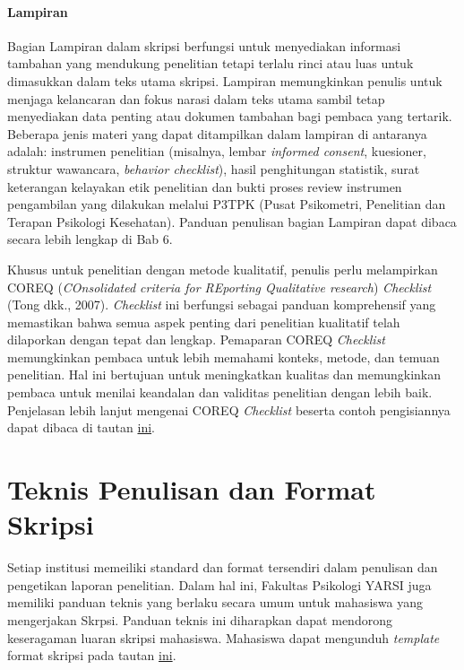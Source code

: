 \documentclass[
  indonesian,
  letterpaper,
]{scrbook}
\begin{document}
\subsubsection{Lampiran}\label{lampiran}

Bagian Lampiran dalam skripsi berfungsi untuk menyediakan informasi
tambahan yang mendukung penelitian tetapi terlalu rinci atau luas untuk
dimasukkan dalam teks utama skripsi. Lampiran memungkinkan penulis untuk
menjaga kelancaran dan fokus narasi dalam teks utama sambil tetap
menyediakan data penting atau dokumen tambahan bagi pembaca yang
tertarik. Beberapa jenis materi yang dapat ditampilkan dalam lampiran di
antaranya adalah: instrumen penelitian (misalnya, lembar \emph{informed
consent}, kuesioner, struktur wawancara, \emph{behavior checklist}),
hasil penghitungan statistik, surat keterangan kelayakan etik penelitian
dan bukti proses review instrumen pengambilan yang dilakukan melalui
P3TPK (Pusat Psikometri, Penelitian dan Terapan Psikologi Kesehatan).
Panduan penulisan bagian Lampiran dapat dibaca secara lebih lengkap di
Bab 6.

Khusus untuk penelitian dengan metode kualitatif, penulis perlu
melampirkan COREQ (\emph{COnsolidated criteria for REporting Qualitative
research}) \emph{Checklist} (Tong dkk., 2007). \emph{Checklist} ini
berfungsi sebagai panduan komprehensif yang memastikan bahwa semua aspek
penting dari penelitian kualitatif telah dilaporkan dengan tepat dan
lengkap. Pemaparan COREQ \emph{Checklist} memungkinkan pembaca untuk
lebih memahami konteks, metode, dan temuan penelitian. Hal ini bertujuan
untuk meningkatkan kualitas dan memungkinkan pembaca untuk menilai
keandalan dan validitas penelitian dengan lebih baik. Penjelasan lebih
lanjut mengenai COREQ \emph{Checklist} beserta contoh pengisiannya dapat
dibaca di tautan
\href{https://drive.google.com/drive/folders/1T1IgsToy4j0-BKgHVvShJM5zYF14A10C?usp=drive_link}{ini}.


\chapter{Teknis Penulisan dan Format
Skripsi}\label{teknis-penulisan-dan-format-skripsi}

Setiap institusi memeiliki standard dan format tersendiri dalam
penulisan dan pengetikan laporan penelitian. Dalam hal ini, Fakultas
Psikologi YARSI juga memiliki panduan teknis yang berlaku secara umum
untuk mahasiswa yang mengerjakan Skrpsi. Panduan teknis ini diharapkan
dapat mendorong keseragaman luaran skripsi mahasiswa. Mahasiswa dapat
mengunduh \emph{template} format skripsi pada tautan
\href{https://drive.google.com/file/d/1Qxn2S_09NiJaV__Aqd3o9aqdDlvM-dWr/view?usp=sharing}{ini}.
\end{document}

